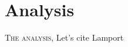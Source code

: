 \chapter{Analysis}
\label{cha:analysis}


\lettrine{T}{he analysis},
Let's cite Lamport \cite{lamport94} 
\lipsum[1-2]
